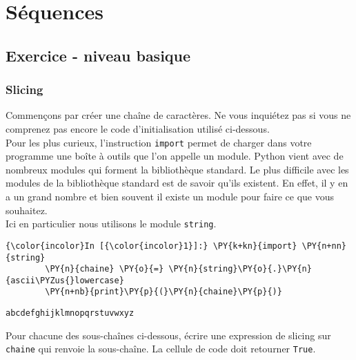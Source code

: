     \hypertarget{suxe9quences}{%
\section{Séquences}\label{suxe9quences}}

    \hypertarget{exercice---niveau-basique}{%
\subsection{Exercice - niveau basique}\label{exercice---niveau-basique}}

    \hypertarget{slicing}{%
\subsubsection{Slicing}\label{slicing}}

    Commençons par créer une chaîne de caractères. Ne vous inquiétez pas si
vous ne comprenez pas encore le code d'initialisation utilisé
ci-dessous.\\

Pour les plus curieux, l'instruction \texttt{import} permet de charger
dans votre programme une boîte à outils que l'on appelle un module.
Python vient avec de nombreux modules qui forment la bibliothèque
standard. Le plus difficile avec les modules de la bibliothèque standard
est de savoir qu'ils existent. En effet, il y en a un grand nombre et
bien souvent il existe un module pour faire ce que vous souhaitez.\\

Ici en particulier nous utilisons le module \texttt{string}.

    \begin{Verbatim}[commandchars=\\\{\}]
{\color{incolor}In [{\color{incolor}1}]:} \PY{k+kn}{import} \PY{n+nn}{string}
        \PY{n}{chaine} \PY{o}{=} \PY{n}{string}\PY{o}{.}\PY{n}{ascii\PYZus{}lowercase}
        \PY{n+nb}{print}\PY{p}{(}\PY{n}{chaine}\PY{p}{)}
\end{Verbatim}


    \begin{Verbatim}[commandchars=\\\{\}]
abcdefghijklmnopqrstuvwxyz

    \end{Verbatim}

    Pour chacune des sous-chaînes ci-dessous, écrire une expression de
slicing sur \texttt{chaine} qui renvoie la sous-chaîne. La cellule de
code doit retourner \texttt{True}.

